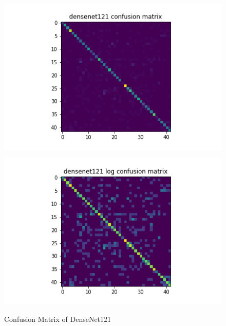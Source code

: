 \begin{figure}[t]
\begin{minipage}[b]{.5\linewidth}
    {\includegraphics[width=1.2\textwidth]{figs/conf_matrix/densenet121_conf.png}}
  \end{minipage}
  \hfill
  \begin{minipage}[b]{.5\linewidth}
    \centering

    {\includegraphics[width=1.2\textwidth]{figs/conf_matrix/densenet121_log_conf.png}}

  \end{minipage}

  \caption{Confusion Matrix of DenseNet121}
  \label{fig:densenet121_conf}
  \vspace{0.2in}
\end{figure}

